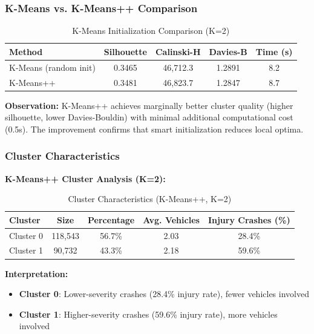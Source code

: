 \documentclass[12pt,man]{apa7}
\begin{document}
\subsubsection{K-Means vs. K-Means++ Comparison}

\begin{table}[H]
\centering
\caption{K-Means Initialization Comparison (K=2)}
\begin{tabular}{lcccc}
\toprule
\textbf{Method} & \textbf{Silhouette} & \textbf{Calinski-H} & \textbf{Davies-B} & \textbf{Time (s)} \\
\midrule
K-Means (random init) & 0.3465 & 46,712.3 & 1.2891 & 8.2 \\
K-Means++ & 0.3481 & 46,823.7 & 1.2847 & 8.7 \\
\bottomrule
\end{tabular}
\end{table}

\textbf{Observation:} K-Means++ achieves marginally better cluster quality (higher silhouette, lower Davies-Bouldin) with minimal additional computational cost (0.5s). The improvement confirms that smart initialization reduces local optima.

\subsubsection{Cluster Characteristics}

\textbf{K-Means++ Cluster Analysis (K=2):}

\begin{table}[H]
\centering
\caption{Cluster Characteristics (K-Means++, K=2)}
\begin{tabular}{lcccc}
\toprule
\textbf{Cluster} & \textbf{Size} & \textbf{Percentage} & \textbf{Avg. Vehicles} & \textbf{Injury Crashes (\%)} \\
\midrule
Cluster 0 & 118,543 & 56.7\% & 2.03 & 28.4\% \\
Cluster 1 & 90,732 & 43.3\% & 2.18 & 59.6\% \\
\bottomrule
\end{tabular}
\end{table}

\textbf{Interpretation:}
\begin{itemize}
    \item \textbf{Cluster 0}: Lower-severity crashes (28.4\% injury rate), fewer vehicles involved
    \item \textbf{Cluster 1}: Higher-severity crashes (59.6\% injury rate), more vehicles involved
\end{itemize}
\end{document}
